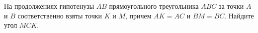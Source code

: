 \begin{ex}
	\begin{condition}
		На продолжениях гипотенузы \( AB  \) прямоугольного	треугольника \( ABC  \) за точки \( A  \) и \( B  \) соответственно взяты точки \( K  \) и \( M  \), причем \( AK = AC  \) и \( BM = BC \). Найдите угол \( MCK \).
	\end{condition}
	\answer{\( 135\degree \)}
\end{ex}